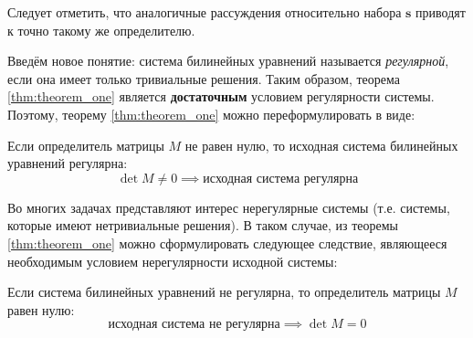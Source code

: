 Следует отметить, что аналогичные рассуждения относительно набора $\mathbf{s}$ приводят к точно такому же 
определителю. 

Введём новое понятие: система билинейных уравнений называется \textit{регулярной}, если она 
имеет только тривиальные решения. Таким образом, теорема \ref{thm:theorem_one} является 
\textbf{достаточным} условием регулярности системы. Поэтому, теорему \ref{thm:theorem_one} можно 
переформулировать в виде: 
\begin{theorem_alt}
Если определитель матрицы $M$ не равен нулю, то исходная система билинейных уравнений регулярна:
$$
\det M \ne 0 \implies\text{исходная система регулярна} 
$$
\end{theorem_alt}

Во многих задачах представляют интерес нерегулярные системы (т.е. системы, которые имеют нетривиальные 
решения). В таком случае, из теоремы \ref{thm:theorem_one} можно сформулировать следующее следствие, 
являющееся необходимым условием нерегулярности исходной системы:

\begin{consequence}
	Если система билинейных уравнений не регулярна, то определитель матрицы $M$ равен нулю:
	$$
	\text{исходная система не регулярна} \implies \det M = 0 
	$$
\end{consequence}



              
